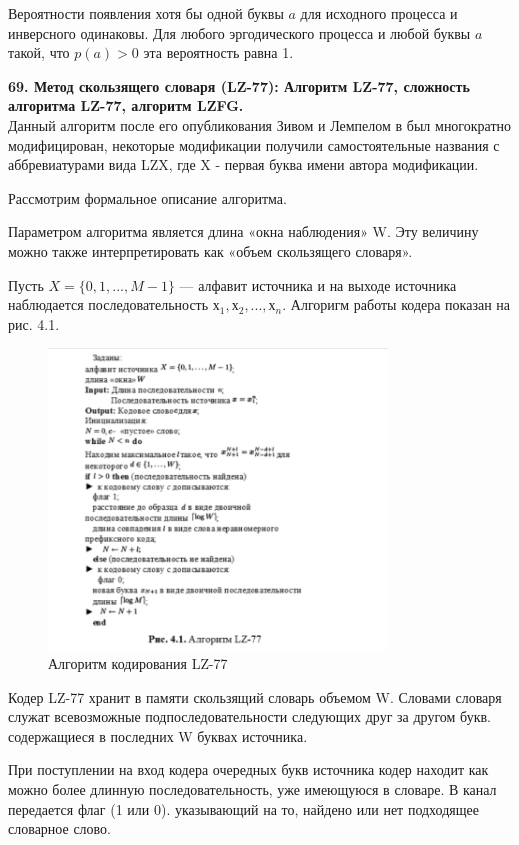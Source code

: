 \documentclass[14pt]{article}
\begin{document}
Вероятности появления хотя бы одной буквы \(a\) для исходного процесса и инверсного одинаковы. Для любого эргодического процесса и любой
буквы \(a\) такой, что \(p(a) > 0\) эта вероятность равна 1.

\bigskip
\textbf{69. Метод скользящего словаря (LZ-77): Алгоритм LZ-77, сложность алгоритма LZ-77, алгоритм LZFG.} \\

Данный алгоритм после его опубликования Зивом и Лемпелом в  был многократно модифицирован, некоторые модификации получили самостоятельные названия с аббревиатурами вида LZX, где X - первая буква имени автора модификации.

Рассмотрим формальное описание алгоритма.

Параметром алгоритма является длина «окна наблюдения» W. Эту величину можно также интерпретировать как «объем скользящего словаря».

Пусть \(X = \{0,1,..., M-1\}\) — алфавит источника и на выходе источника наблюдается последовательность \(х_1, х_2, ... ,х_n\). Алгоригм работы кодера показан на рис. 4.1.

\begin{figure}[ht!]
\centering
    \includegraphics[width=90mm]{lz77_alg.png}
\caption{Алгоритм кодирования LZ-77}
\end{figure}


Кодер LZ-77 хранит в памяти скользящий словарь объемом W. Словами словаря служат всевозможные подпоследовательности следующих друг за другом букв. содержащиеся в последних W буквах источника.

При поступлении на вход кодера очередных букв источника кодер находит как можно более длинную последовательность, уже имеющуюся в словаре. В канал передается флаг (1 или 0). указывающий на то, найдено или нет подходящее словарное слово.
\end{document}
